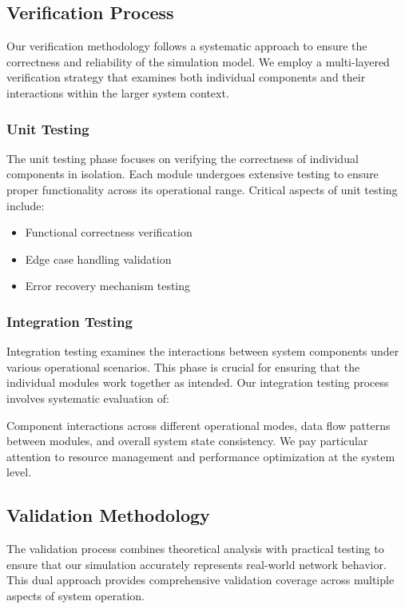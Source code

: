\documentclass[12pt]{article}
\begin{document}
\subsection{Verification Process}
Our verification methodology follows a systematic approach to ensure the correctness and reliability of the simulation model. We employ a multi-layered verification strategy that examines both individual components and their interactions within the larger system context.

\subsubsection{Unit Testing}
The unit testing phase focuses on verifying the correctness of individual components in isolation. Each module undergoes extensive testing to ensure proper functionality across its operational range. Critical aspects of unit testing include:
\begin{itemize}[noitemsep]
    \item Functional correctness verification
    \item Edge case handling validation
    \item Error recovery mechanism testing
\end{itemize}

\subsubsection{Integration Testing}
Integration testing examines the interactions between system components under various operational scenarios. This phase is crucial for ensuring that the individual modules work together as intended. Our integration testing process involves systematic evaluation of:

Component interactions across different operational modes, data flow patterns between modules, and overall system state consistency. We pay particular attention to resource management and performance optimization at the system level.

\subsection{Validation Methodology}
The validation process combines theoretical analysis with practical testing to ensure that our simulation accurately represents real-world network behavior. This dual approach provides comprehensive validation coverage across multiple aspects of system operation.
\end{document}
